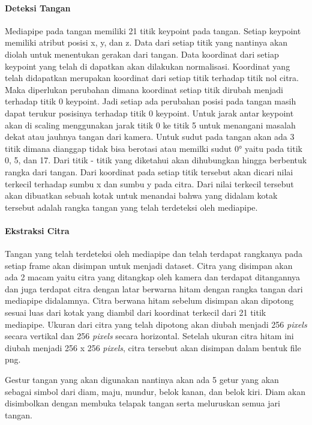 \paragraph{Deteksi Tangan}
Mediapipe pada tangan memiliki 21 titik keypoint pada tangan. Setiap keypoint memiliki atribut posisi x, y, dan z. Data dari setiap titik yang nantinya akan diolah untuk menentukan gerakan dari tangan. Data koordinat dari setiap keypoint yang telah di dapatkan akan dilakukan normalisasi. Koordinat yang telah didapatkan merupakan koordinat dari setiap titik terhadap titik nol citra. Maka diperlukan perubahan dimana  koordinat setiap titik dirubah menjadi terhadap titik 0 keypoint. Jadi setiap ada perubahan posisi pada tangan masih dapat terukur posisinya terhadap titik 0 keypoint. Untuk jarak antar keypoint akan di scaling menggunakan jarak titik 0 ke titik 5 untuk menangani masalah dekat atau jauhnya tangan dari kamera. Untuk sudut pada tangan akan ada 3 titik dimana dianggap tidak bisa berotasi atau memilki sudut 0° yaitu pada titik 0, 5, dan 17. Dari titik - titik yang diketahui akan dihubungkan hingga berbentuk rangka dari tangan. Dari koordinat pada setiap titik tersebut akan dicari nilai terkecil terhadap sumbu x dan sumbu y pada citra. Dari nilai terkecil tersebut akan dibuatkan sebuah kotak untuk menandai bahwa yang didalam kotak tersebut adalah rangka tangan yang telah terdeteksi oleh mediapipe. 

\paragraph{Ekstraksi Citra}
Tangan yang telah terdeteksi oleh mediapipe dan telah terdapat rangkanya pada setiap frame akan disimpan untuk menjadi dataset. Citra yang disimpan akan ada 2 macam yaitu citra yang ditangkap oleh kamera dan terdapat ditangannya dan juga terdapat citra dengan latar berwarna hitam dengan rangka tangan dari mediapipe didalamnya. Citra berwana hitam sebelum disimpan akan dipotong sesuai luas dari kotak yang diambil dari koordinat terkecil dari 21 titik mediapipe. Ukuran dari citra yang telah dipotong akan diubah menjadi 256 {\textit{pixels}} secara vertikal dan 256 {\textit{pixels}} secara horizontal. Setelah ukuran citra hitam ini diubah menjadi 256 x 256 {\textit{pixels}}, citra tersebut akan disimpan dalam bentuk file png.

Gestur tangan yang akan digunakan nantinya akan ada 5 getur yang akan sebagai simbol dari diam, maju, mundur, belok kanan, dan belok kiri. Diam akan disimbolkan dengan membuka telapak tangan serta meluruskan semua jari tangan. 


